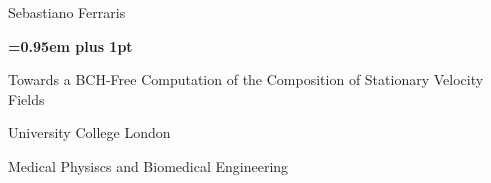 \documentclass[a4paper,10pt]{book}
\theoremstyle{definition}
\begin{document}
\begin{titlepage}
%
\pagestyle{empty}
\begingroup
\vspace*{-7\topskip}

\vspace{-0.95 cm}

\begin{figure}[!h]
	\hspace{-2.5cm} %
	
\end{figure}
\vspace{1cm}

\begin{center}
	{\LARGE{Sebastiano Ferraris}\par}  %
\end{center}
\vspace{1.8cm}
\begin{center}
        {\huge\bf \baselineskip=0.95em plus 1pt \expandafter{
        		Towards a BCH-Free Computation of the Composition of Stationary Velocity Fields
        \par}}
\end{center}

\vspace{2.7cm}

\begin{center}
	\LARGE{\rm\expandafter{University College London}}\par
	\expandafter{\Large{Medical Physiscs and Biomedical Engineering}\par}
\end{center}


\end{titlepage}
\end{document}
